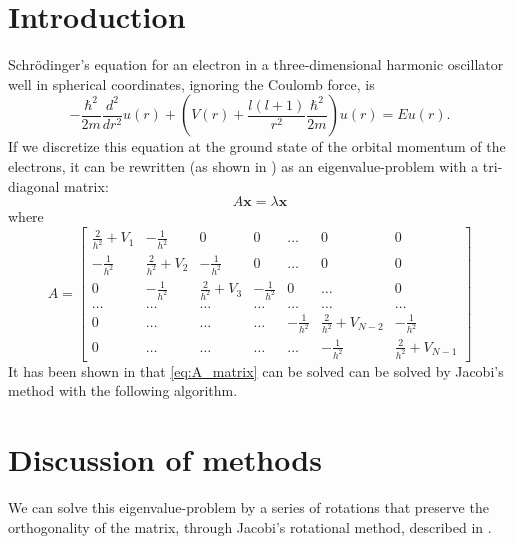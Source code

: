 \documentclass[a4paper]{article}
\begin{document}
\section{Introduction}\label{sec:intro}
Schrödinger's equation for an electron in a three-dimensional harmonic oscillator well in spherical coordinates, ignoring the Coulomb force, is
\begin{equation}
  -\frac{\hbar^2}{2 m} \frac{d^2}{dr^2} u(r)
       + \left ( V(r) + \frac{l (l + 1)}{r^2}\frac{\hbar^2}{2 m}
                                    \right ) u(r)  = E u(r) .
\end{equation}
If we discretize this equation at the ground state of the orbital momentum of the electrons, it can be rewritten (as shown in \cite{fys3150_project2}) as an eigenvalue-problem with a tri-diagonal matrix:
\begin{equation*}
A\textbf{x} = \lambda \textbf{x}
\end{equation*}
where
\begin{equation}
A = \begin{bmatrix} \frac{2}{h^2}+V_1 & -\frac{1}{h^2} & 0   & 0    & \dots  &0     & 0 \\
                                -\frac{1}{h^2} & \frac{2}{h^2}+V_2 & -\frac{1}{h^2} & 0    & \dots  &0     &0 \\
                                0   & -\frac{1}{h^2} & \frac{2}{h^2}+V_3 & -\frac{1}{h^2}  &0       &\dots & 0\\
                                \dots  & \dots & \dots & \dots  &\dots      &\dots & \dots\\
                                0   & \dots & \dots & \dots  &-\frac{1}{h^2}  &\frac{2}{h^2}+V_{N-2} & -\frac{1}{h^2}\\
                                0   & \dots & \dots & \dots  &\dots       &-\frac{1}{h^2} & \frac{2}{h^2}+V_{N-1}
             \end{bmatrix}
\label{eq:A_matrix}
\end{equation}
It has been shown in \cite{mhj_lecture_notes} that \eqref{eq:A_matrix} can be solved can be solved by Jacobi's method with the following algorithm.




\section{Discussion of methods}\label{sec:methods}
We can solve this eigenvalue-problem by a series of rotations that preserve the orthogonality of the matrix, through Jacobi's rotational method, described in \cite{mhj_lecture_notes}.
\end{document}
